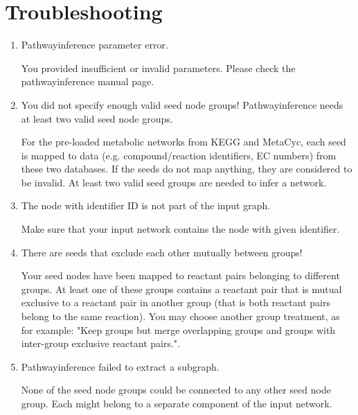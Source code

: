 \section{Troubleshooting}

\begin{enumerate}

\item Pathwayinference parameter error.

	You provided insufficient or invalid parameters. Please check the pathwayinference manual page.

\item You did not specify enough valid seed node groups! Pathwayinference needs at least two valid seed node groups.

	For the pre-loaded metabolic networks from KEGG and MetaCyc, each seed
	is mapped to data (e.g. compound/reaction identifiers, EC numbers) from these two databases.
	If the seeds do not map anything, they are considered to be invalid.
	At least two valid seed groups are needed to infer a network.

\item The node with identifier ID is not part of the input graph.

	Make sure that your input network contains the node with given identifier.

\item There are seeds that exclude each other mutually between groups!

	Your seed nodes have been mapped to reactant pairs belonging to different groups. At least one of these groups contains
	a reactant pair that is mutual exclusive to a reactant pair in another group (that is both reactant pairs belong to the
	same reaction). You may choose another group treatment, as for example:
	"Keep groups but merge overlapping groups and groups with inter-group exclusive reactant pairs.".

\item Pathwayinference failed to extract a subgraph.

    None of the seed node groups could be connected to any other seed node group. Each might belong to a
    separate component of the input network.

\end{enumerate}
